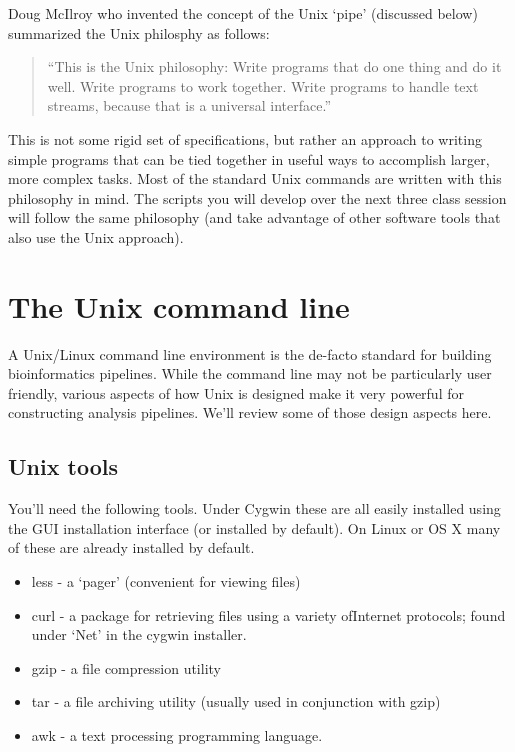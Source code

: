 Doug McIlroy who invented the concept of the Unix `pipe' (discussed below) summarized the Unix philosphy as follows:

\begin{quote}
``This is the Unix philosophy: Write programs that do one thing and do it well. Write programs to work together. Write programs to handle text streams, because that is a universal interface.''
\end{quote}

This is not some rigid set of specifications, but rather an approach to writing simple programs that can be tied together in useful ways to accomplish larger, more complex tasks. Most of the standard Unix commands are written with this philosophy in mind. The scripts you will develop over the next three class session will follow the same philosophy (and take advantage of other software tools that also use the Unix approach).

\section{The Unix command line}

A Unix/Linux command line environment is the de-facto standard for building bioinformatics pipelines. While the command line may not be particularly user friendly, various aspects of how Unix is designed make it very powerful for constructing analysis pipelines.  We'll review some of those design aspects here.


\subsection{Unix tools}

You'll need the following tools. Under Cygwin these are all easily installed using the GUI installation interface (or installed by default). On Linux or OS X many of these are already installed by default.

\begin{itemize}
    \item less - a `pager' (convenient for viewing files)
    \item curl - a package for retrieving files using a variety ofInternet protocols; found under `Net' in the cygwin installer.
    \item gzip - a file compression utility
    \item tar - a file archiving utility (usually used in conjunction with gzip)
    \item awk - a text processing programming language.
\end{itemize}


